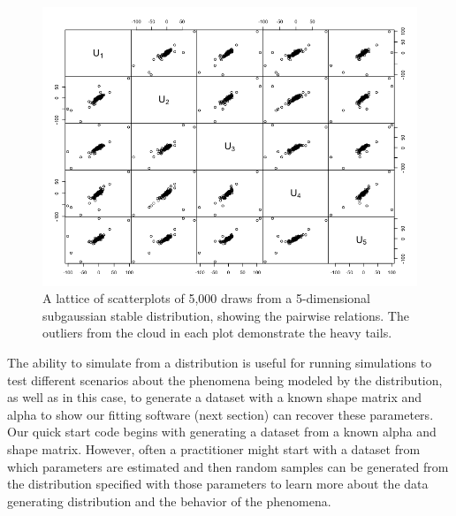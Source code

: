 \begin{figure}
  \center
  \includegraphics[scale=0.4]{copulascatter.png}
\caption{A lattice of scatterplots of 5,000 draws from a 5-dimensional subgaussian
    stable distribution, showing the pairwise relations.  The outliers
    from the cloud in each plot demonstrate the heavy tails.}
  \label{fig:scatter}
\end{figure}


The ability to simulate from a distribution is useful for running
simulations to test different scenarios about the phenomena being
modeled by the distribution, as well as in this case, to generate a
dataset with a known shape matrix and alpha to show our fitting
software (next section) can recover these parameters.  Our quick start
code begins with generating a dataset from a known alpha and shape
matrix. However, often a practitioner might start with a dataset from
which parameters are estimated and then random samples can be
generated from the distribution specified with those parameters to
learn more about the data generating distribution and the behavior of
the phenomena.

